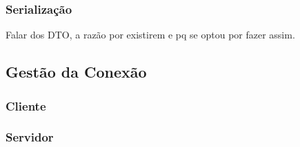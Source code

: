 \documentclass[relatorio.tex]{subfiles}
\begin{document}
\subsubsection{Serialização}
Falar dos DTO, a razão por existirem e pq se optou por fazer assim.

\subsection{Gestão da Conexão}

\subsubsection{Cliente}

\subsubsection{Servidor}
\end{document}
